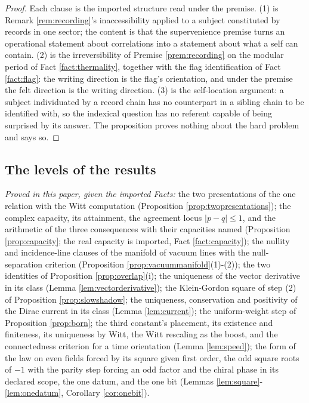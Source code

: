 \documentclass[11pt]{article}
\theoremstyle{definition}
\begin{document}
\begin{proof}
Each clause is the imported structure read under the premise. (1) is Remark \ref{rem:recording}'s inaccessibility applied to a subject constituted by records in one sector; the content is that the supervenience premise turns an operational statement about correlations into a statement about what a self can contain. (2) is the irreversibility of Premise \ref{prem:recording} on the modular period of Fact \ref{fact:thermality}, together with the flag identification of Fact \ref{fact:flag}: the writing direction is the flag's orientation, and under the premise the felt direction is the writing direction. (3) is the self-location argument: a subject individuated by a record chain has no counterpart in a sibling chain to be identified with, so the indexical question has no referent capable of being surprised by its answer. The proposition proves nothing about the hard problem and says so.
\end{proof}

\subsection*{The levels of the results}

\emph{Proved in this paper, given the imported Facts:} the two presentations of the one relation with the Witt computation (Proposition \ref{prop:twopresentations}); the complex capacity, its attainment, the agreement locus $|p - q| \leq 1$, and the arithmetic of the three consequences with their capacities named (Proposition \ref{prop:capacity}; the real capacity is imported, Fact \ref{fact:capacity}); the nullity and incidence-line clauses of the manifold of vacuum lines with the null-separation criterion (Proposition \ref{prop:vacuummanifold}(1)-(2)); the two identities of Proposition \ref{prop:overlap}(i); the uniqueness of the vector derivative in its class (Lemma \ref{lem:vectorderivative}); the Klein-Gordon square of step (2) of Proposition \ref{prop:slowshadow}; the uniqueness, conservation and positivity of the Dirac current in its class (Lemma \ref{lem:current}); the uniform-weight step of Proposition \ref{prop:born}; the third constant's placement, its existence and finiteness, its uniqueness by Witt, the Witt rescaling as the boost, and the connectedness criterion for a time orientation (Lemma \ref{lem:speed}); the form of the law on even fields forced by its square given first order, the odd square roots of $-1$ with the parity step forcing an odd factor and the chiral phase in its declared scope, the one datum, and the one bit (Lemmas \ref{lem:square}-\ref{lem:onedatum}, Corollary \ref{cor:onebit}).
\end{document}
